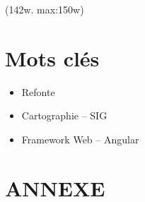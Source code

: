 \documentclass{rapportUHA40}
\begin{document}
(142w. max:150w)

\section*{Mots clés}
\begin{itemize}
  \item Refonte
  \item Cartographie – SIG
  \item Framework Web – Angular
\end{itemize}

\newpage

\appendix
\section{ANNEXE}
\end{document}
